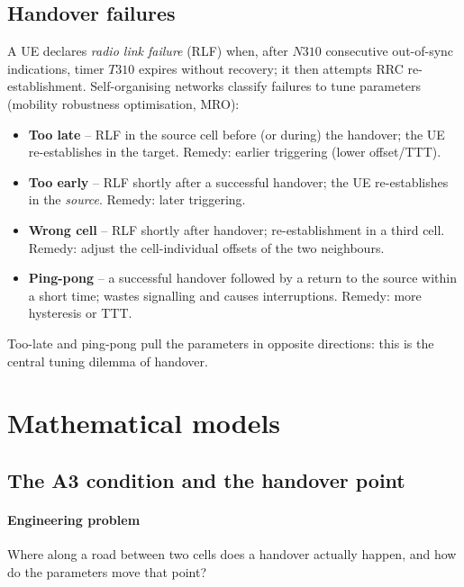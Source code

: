 \documentclass[11pt,a4paper]{article}
\begin{document}
\subsection{Handover failures}
A UE declares \emph{radio link failure} (RLF) when, after $N310$ consecutive out-of-sync
indications, timer $T310$ expires without recovery; it then attempts RRC re-establishment.
Self-organising networks classify failures to tune parameters (mobility robustness
optimisation, MRO):
\begin{itemize}
  \item \textbf{Too late} -- RLF in the source cell before (or during) the handover; the UE
        re-establishes in the target. Remedy: earlier triggering (lower offset/TTT).
  \item \textbf{Too early} -- RLF shortly after a successful handover; the UE re-establishes in the
        \emph{source}. Remedy: later triggering.
  \item \textbf{Wrong cell} -- RLF shortly after handover; re-establishment in a third cell.
        Remedy: adjust the cell-individual offsets of the two neighbours.
  \item \textbf{Ping-pong} -- a successful handover followed by a return to the source within a
        short time; wastes signalling and causes interruptions. Remedy: more hysteresis or TTT.
\end{itemize}
Too-late and ping-pong pull the parameters in opposite directions: this is the central
tuning dilemma of handover.

\section{Mathematical models}

\subsection{The A3 condition and the handover point}\label{sec:a3}
\paragraph{Engineering problem} Where along a road between two cells does a handover actually
happen, and how do the parameters move that point?
\end{document}

